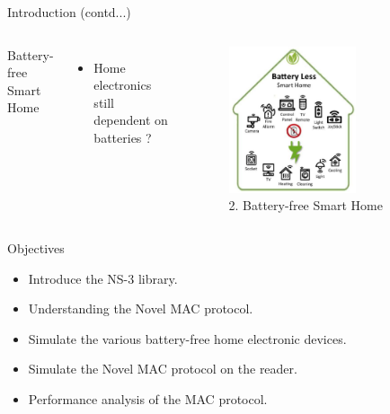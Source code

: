 \documentclass [xcolor=svgnames, t] {beamer}
\begin{document}
\begin{frame}{Introduction (contd...)}
    \begin{center}
        \begin{columns}[onlytextwidth]   
            Battery-free Smart Home\\
            \vspace{1cm}
            \begin{itemize}
                \item  Home electronics still dependent on batteries ?
            \end{itemize}

            \begin{figure}
                \centering
                \includegraphics[width=0.65\textwidth]{not-so-smart-devices.png}
                \caption{2. Battery-free Smart Home }
                \label{fig:my_label}
            \end{figure}
        \end{columns}
    \end{center}
\end{frame}


\begin{frame}{Objectives}
    \vspace{1.5cm}   
    \begin{itemize}
        \item Introduce the NS-3 library.
        \item Understanding the Novel MAC protocol.
        \item Simulate the various battery-free home electronic devices.
        \item Simulate the Novel MAC protocol on the reader.
        \item Performance analysis of the MAC protocol.
    \end{itemize}
\end{frame}
\end{document}
